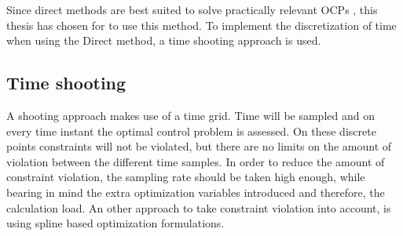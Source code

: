 Since direct methods are best suited to solve practically relevant OCPs \cite{Mercy2018}, this thesis has chosen for to use this method. To implement the discretization of time when using the Direct method, a time shooting approach is used.

\subsection{Time shooting}
A shooting approach makes use of a time grid. Time will be sampled and on every time instant the optimal control problem is assessed. On these discrete points constraints will not be violated, but there are no limits on the amount of violation between the different time samples. In order to reduce the amount of constraint violation, the sampling rate should be taken high enough, while bearing in mind the extra optimization variables introduced and therefore, the calculation load. An other approach to take constraint violation into account, is using spline based optimization formulations. \cite{Mercy2018}\\

